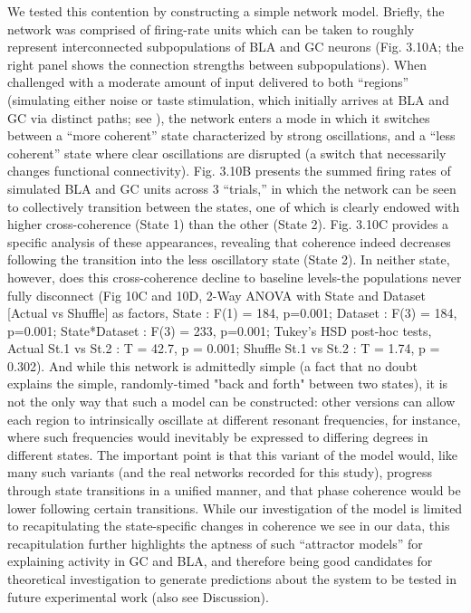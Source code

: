 \begin{refsection}
We tested this contention by constructing a simple network model. Briefly, the network was comprised of firing-rate units which can be taken to roughly represent interconnected subpopulations of BLA and GC neurons (Fig. 3.10A; the right panel shows the connection strengths between subpopulations). When challenged with a moderate amount of input delivered to both “regions” (simulating either noise or taste stimulation, which initially arrives at BLA and GC via distinct paths; see \cite{gal-ben-ari2012a}), the network enters a mode in which it switches between a “more coherent” state characterized by strong oscillations, and a “less coherent” state where clear oscillations are disrupted (a switch that necessarily changes functional connectivity). Fig. 3.10B presents the summed firing rates of simulated BLA and GC units across 3 “trials,” in which the network can be seen to collectively transition between the states, one of which is clearly endowed with higher cross-coherence (State 1) than the other (State 2).
Fig. 3.10C provides a specific analysis of these appearances, revealing that coherence indeed decreases following the transition into the less oscillatory state (State 2). In neither state, however, does this cross-coherence decline to baseline levels-the populations never fully disconnect (Fig 10C and 10D, 2-Way ANOVA with State and Dataset [Actual vs Shuffle] as factors, State : F(1) = 184, p=0.001; Dataset : F(3) = 184, p=0.001; State*Dataset : F(3) = 233, p=0.001; Tukey’s HSD post-hoc tests, Actual St.1 vs St.2 : T = 42.7, p = 0.001; Shuffle St.1 vs St.2 : T = 1.74, p = 0.302). And while this network is admittedly simple (a fact that no doubt explains the simple, randomly-timed "back and forth" between two states), it is not the only way that such a model can be constructed: other versions can allow each region to intrinsically oscillate at different resonant frequencies, for instance, where such frequencies would inevitably be expressed to differing degrees in different states. The important point is that this variant of the model would, like many such variants (and the real networks recorded for this study), progress through state transitions in a unified manner, and that phase coherence would be lower following certain transitions. While our investigation of the model is limited to recapitulating the state-specific changes in coherence we see in our data, this recapitulation further highlights the aptness of such “attractor models” for explaining activity in GC and BLA, and therefore being good candidates for theoretical investigation to generate predictions about the system to be tested in future experimental work (also see Discussion).


\end{refsection}
